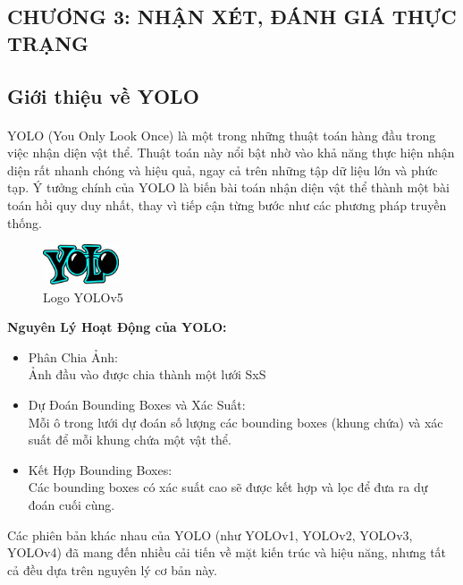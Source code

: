 \begin{flushleft}
    \fontsize{16}{20}\selectfont
    \section*{CHƯƠNG 3: NHẬN XÉT, ĐÁNH GIÁ THỰC TRẠNG}
    \fontsize{13}{20}\selectfont
    \setcounter{section}{3}
    \setcounter{subsection}{0}
    \subsection{Giới thiệu về YOLO}
    \fontsize{13}{20}\selectfont\paragraph{}
    YOLO (You Only Look Once) là một trong những thuật toán hàng đầu trong việc nhận diện vật thể. Thuật toán này nổi bật nhờ vào khả năng thực hiện nhận diện rất nhanh chóng và hiệu quả, ngay cả trên những tập dữ liệu lớn và phức tạp. Ý tưởng chính của YOLO là biến bài toán nhận diện vật thể thành một bài toán hồi quy duy nhất, thay vì tiếp cận từng bước như các phương pháp truyền thống.\\
    \begin{figure}[h]
        \centering
        \includegraphics[width=0.2\textwidth]{images/YOLO.jpg}
        \caption{Logo YOLOv5}\label{fig:logo_YOLO}
    \end{figure}
    \textbf{Nguyên Lý Hoạt Động của YOLO:}\\
    \begin{itemize}
            \item Phân Chia Ảnh: \\Ảnh đầu vào được chia thành một lưới SxS
            \item Dự Đoán Bounding Boxes và Xác Suất:\\Mỗi ô trong lưới dự đoán số lượng các bounding boxes (khung chứa) và xác suất để mỗi khung chứa một vật thể.
            \item Kết Hợp Bounding Boxes: \\Các bounding boxes có xác suất cao sẽ được kết hợp và lọc để đưa ra dự đoán cuối cùng.
    \end{itemize}
    Các phiên bản khác nhau của YOLO (như YOLOv1, YOLOv2, YOLOv3, YOLOv4) đã mang đến nhiều cải tiến về mặt kiến trúc và hiệu năng, nhưng tất cả đều dựa trên nguyên lý cơ bản này.\\

\end{flushleft}
